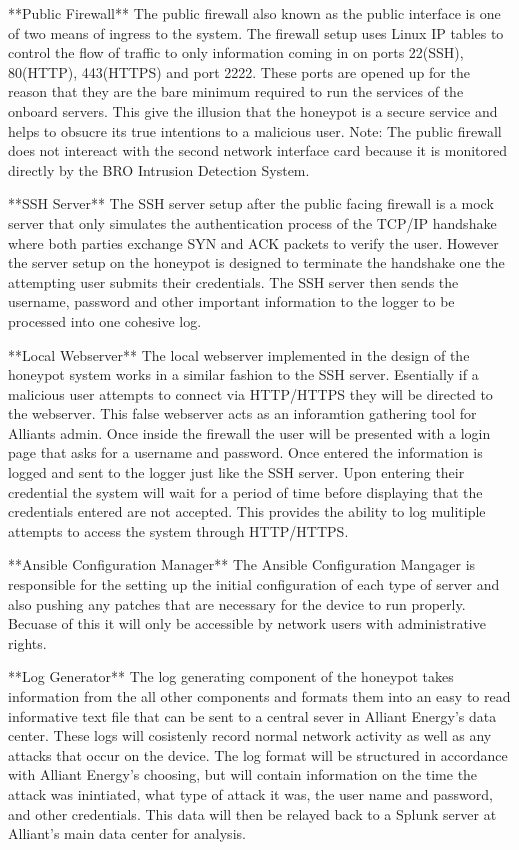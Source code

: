 **Public Firewall**
The public firewall also known as the public interface is one of two means of ingress to the system.  The firewall setup uses Linux IP tables to control the flow of traffic to only information coming in on ports 22(SSH), 80(HTTP), 443(HTTPS) and port 2222.  These ports are opened up for the reason that they are the bare minimum required to run the services of the onboard servers.  This give the illusion that the honeypot is a secure service and helps to obsucre its true intentions to a malicious user.  Note: The public firewall does not intereact with the second network interface card because it is monitored directly by the BRO Intrusion Detection System.

**SSH Server**
The SSH server setup after the public facing firewall is a mock server that only simulates the authentication process of the TCP/IP handshake where both parties exchange SYN and ACK packets to verify the user.  However the server setup on the honeypot is designed to terminate the handshake one the attempting user submits their credentials.  The SSH server then sends the username, password and other important information to the logger to be processed into one cohesive log.

**Local Webserver**
The local webserver implemented in the design of the honeypot system works in a similar fashion to the SSH server. Esentially if a malicious user attempts to connect via HTTP/HTTPS they will be directed to the webserver.  This false webserver acts as an inforamtion gathering tool for Alliants admin.  Once inside the firewall the user will be presented with a login page that asks for a username and password.  Once entered the information is logged and sent to the logger just like the SSH server.  Upon entering their credential the system will wait for a period of time before displaying that the credentials entered are not accepted.  This provides the ability to log mulitiple attempts to access the system through HTTP/HTTPS.

**Ansible Configuration Manager**
The Ansible Configuration Mangager is responsible for the setting up the initial configuration of each type of server and also pushing any patches that are necessary for the device to run properly.  Becuase of this it will only be accessible by network users with administrative rights.

**Log Generator**
The log generating component of the honeypot takes information from the all other components and formats them into an easy to read informative text file that can be sent to a central sever in Alliant Energy's data center.  These logs will cosistenly record normal network activity as well as any attacks that occur on the device.  The log format will be structured in accordance with Alliant Energy's choosing, but will contain information on the time the attack was inintiated, what type of attack it was, the user name and password, and other credentials.  This data will then be relayed back to a Splunk server at Alliant's main data center for analysis.

